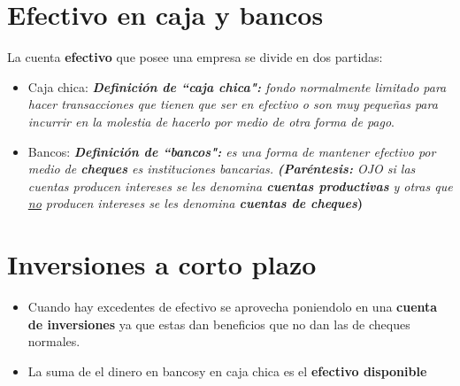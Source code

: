 \documentclass{article}
\begin{document}
\section{Efectivo en caja y bancos}
La cuenta \textbf{efectivo} que posee una empresa se divide en dos partidas:
\begin{itemize}
    \item Caja chica: \emph{\textbf{Definición de ``caja chica":} fondo normalmente limitado para hacer transacciones que tienen que ser en efectivo o son muy pequeñas para incurrir en la molestia de hacerlo por medio de otra forma de pago}.
    \item Bancos: \emph{\textbf{Definición de ``bancos":} es una forma de mantener efectivo por medio de \textbf{cheques} es instituciones bancarias.} \emph{\textbf{(Paréntesis:} OJO si las cuentas producen intereses se les denomina \textbf{cuentas productivas} y otras que \underline{no} producen intereses se les denomina \textbf{cuentas de cheques}}\textbf{)}
\end{itemize}


\section{Inversiones a corto plazo}
\begin{itemize}
    \item Cuando hay excedentes de efectivo se aprovecha poniendolo en una \textbf{cuenta de inversiones} ya que estas dan beneficios que no dan las de cheques normales. 
    \item La suma de el dinero en bancosy en caja chica es el \textbf{efectivo disponible} 
\end{itemize}
\end{document}
